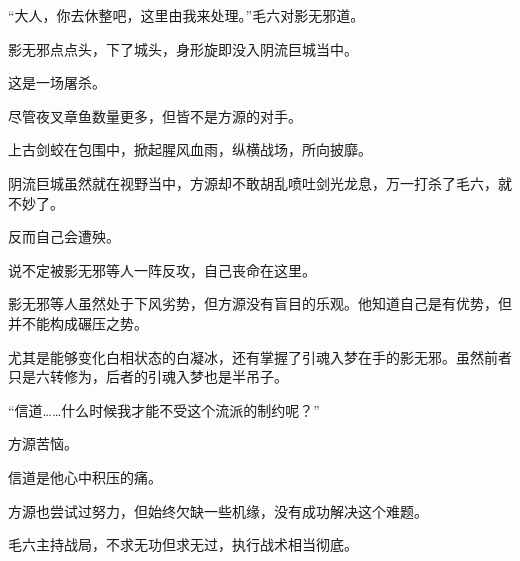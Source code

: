 \begin{this_body}
“大人，你去休整吧，这里由我来处理。”毛六对影无邪道。

影无邪点点头，下了城头，身形旋即没入阴流巨城当中。

这是一场屠杀。

尽管夜叉章鱼数量更多，但皆不是方源的对手。

上古剑蛟在包围中，掀起腥风血雨，纵横战场，所向披靡。

阴流巨城虽然就在视野当中，方源却不敢胡乱喷吐剑光龙息，万一打杀了毛六，就不妙了。

反而自己会遭殃。

说不定被影无邪等人一阵反攻，自己丧命在这里。

影无邪等人虽然处于下风劣势，但方源没有盲目的乐观。他知道自己是有优势，但并不能构成碾压之势。

尤其是能够变化白相状态的白凝冰，还有掌握了引魂入梦在手的影无邪。虽然前者只是六转修为，后者的引魂入梦也是半吊子。

“信道……什么时候我才能不受这个流派的制约呢？”

方源苦恼。

信道是他心中积压的痛。

方源也尝试过努力，但始终欠缺一些机缘，没有成功解决这个难题。

毛六主持战局，不求无功但求无过，执行战术相当彻底。

\end{this_body}

